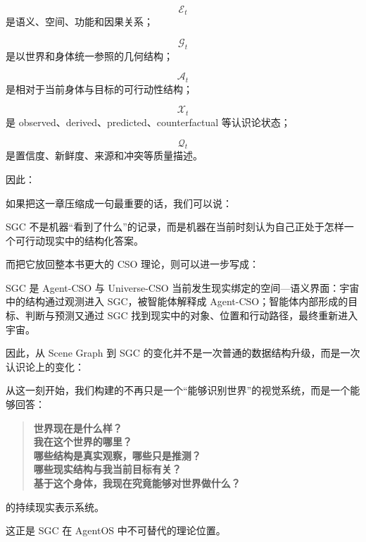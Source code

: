 \[
\mathcal E_t
\]
是语义、空间、功能和因果关系；

\[
\mathcal G_t
\]
是以世界和身体统一参照的几何结构；

\[
\mathcal A_t
\]
是相对于当前身体与目标的可行动性结构；

\[
\mathcal X_t
\]
是 observed、derived、predicted、counterfactual 等认识论状态；

\[
\mathcal Q_t
\]
是置信度、新鲜度、来源和冲突等质量描述。

因此：
\begin{statementbox}
\centering
{}
\end{statementbox}

如果把这一章压缩成一句最重要的话，我们可以说：

\begin{statementbox}
SGC 不是机器“看到了什么”的记录，而是机器在当前时刻认为自己正处于怎样一个可行动现实中的结构化答案。
\end{statementbox}

而把它放回整本书更大的 CSO 理论，则可以进一步写成：

\begin{statementbox}
SGC 是 Agent-CSO 与 Universe-CSO 当前发生现实绑定的空间—语义界面：宇宙中的结构通过观测进入 SGC，被智能体解释成 Agent-CSO；智能体内部形成的目标、判断与预测又通过 SGC 找到现实中的对象、位置和行动路径，最终重新进入宇宙。
\end{statementbox}

因此，从 Scene Graph 到 SGC 的变化并不是一次普通的数据结构升级，而是一次认识论上的变化：

\begin{statementbox}
\centering
{}
\end{statementbox}

从这一刻开始，我们构建的不再只是一个“能够识别世界”的视觉系统，而是一个能够回答：

\begin{quote}
\textbf{世界现在是什么样？}\\
\textbf{我在这个世界的哪里？}\\
\textbf{哪些结构是真实观察，哪些只是推测？}\\
\textbf{哪些现实结构与我当前目标有关？}\\
\textbf{基于这个身体，我现在究竟能够对世界做什么？}
\end{quote}

的持续现实表示系统。

这正是 SGC 在 AgentOS 中不可替代的理论位置。
